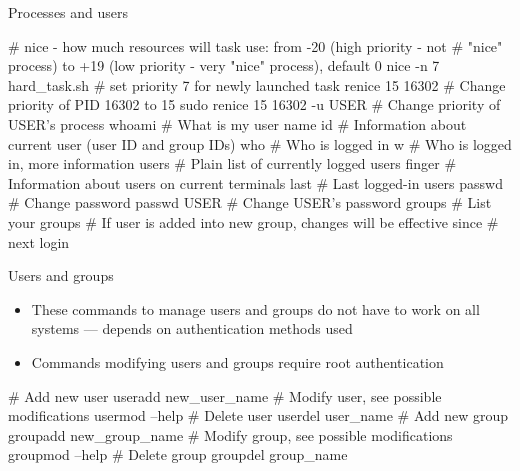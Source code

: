 \documentclass[compress, ucs, xelatex, 11pt, xcolor=svgnames, aspectratio=169,
	hyperref={
		bookmarks=true,
		unicode=true,
		colorlinks=true,
		pdftitle={Linux, command line and MetaCentrum},
		plainpages=false,
		pdfauthor={Vojtech Zeisek},
		pdfsubject={Course about use of Linux command line, writing shell scripts and using MetaCentrum of CESNET},
		pdfcreator={XeLaTeX},
		pdfkeywords={Linux, GNU, BASH, shell, command line, MetaCentrum},
		linkcolor=DarkRed, %
		anchorcolor=DarkBlue, %
		citecolor=Indigo, %
		filecolor=NavyBlue, %
		menucolor=DarkMagenta, %
		urlcolor=DarkBlue, %
		pdftex},
	url={hyphens, lowtilde} %
	]{beamer}
\begin{document}
\begin{frame}[fragile]{Processes and users}
	\begin{bashcode}
    # nice - how much resources will task use: from -20 (high priority - not
    # "nice" process) to +19 (low priority - very "nice" process), default 0
    nice -n 7 hard_task.sh # set priority 7 for newly launched task
    renice 15 16302 # Change priority of PID 16302 to 15
    sudo renice 15 16302 -u USER # Change priority of USER's process
    whoami # What is my user name
    id # Information about current user (user ID and group IDs)
    who # Who is logged in
    w # Who is logged in, more information
    users # Plain list of currently logged users
    finger # Information about users on current terminals
    last # Last logged-in users
    passwd # Change password
    passwd USER # Change USER's password
    groups # List your groups
    # If user is added into new group, changes will be effective since
    # next login
	\end{bashcode}
\end{frame}

\begin{frame}[fragile]{Users and groups}
	\begin{itemize}
		\item These commands to manage users and groups do not have to work on all systems --- depends on authentication methods used
		\item Commands modifying users and groups require root authentication
	\end{itemize}
	\begin{bashcode}
    # Add new user
    useradd new_user_name
    # Modify user, see possible modifications
    usermod --help
    # Delete user
    userdel user_name
    # Add new group
    groupadd new_group_name
    # Modify group, see possible modifications
    groupmod --help
    # Delete group
    groupdel group_name
	\end{bashcode}
\end{frame}
\end{document}
